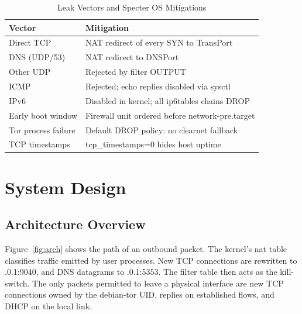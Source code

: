 \documentclass[10pt,twocolumn,a4paper]{article}
\DeclareRobustCommand{\texttt}[1]{\mbox{\ttfamily #1}}
\begin{document}
\begin{table}[t]
\centering
\caption{Leak Vectors and Specter OS Mitigations}
\label{tab:vectors}
\renewcommand{\arraystretch}{1.2}
\footnotesize
\begin{tabularx}{\columnwidth}{|P{2.45cm}|Y|}
\hline
\textbf{Vector} & \textbf{Mitigation} \\ \hline
Direct TCP          & NAT redirect of every \texttt{SYN} to \texttt{TransPort} \\ \hline
DNS (UDP/53)        & NAT redirect to \texttt{DNSPort} \\ \hline
Other UDP           & Rejected by filter \texttt{OUTPUT} \\ \hline
ICMP                & Rejected; echo replies disabled via sysctl \\ \hline
IPv6                & Disabled in kernel; all \texttt{ip6tables} chains \texttt{DROP} \\ \hline
Early boot window   & Firewall unit ordered before \texttt{network-pre.target} \\ \hline
Tor process failure & Default \texttt{DROP} policy: no clearnet fallback \\ \hline
TCP timestamps      & \texttt{tcp\_timestamps=0} hides host uptime \\ \hline
\end{tabularx}
\end{table}

\section{System Design}
\label{sec:design}

\subsection{Architecture Overview}
Figure~\ref{fig:arch} shows the path of an outbound packet. The kernel's
\texttt{nat} table classifies traffic emitted by user processes. New TCP
connections are rewritten to \texttt{127.0.0.1:9040}, and DNS datagrams
to \texttt{127.0.0.1:5353}. The \texttt{filter} table then acts as the
kill-switch. The only packets permitted to leave a physical interface
are new TCP connections owned by the \texttt{debian-tor} UID, replies on
established flows, and DHCP on the local link.
\end{document}
